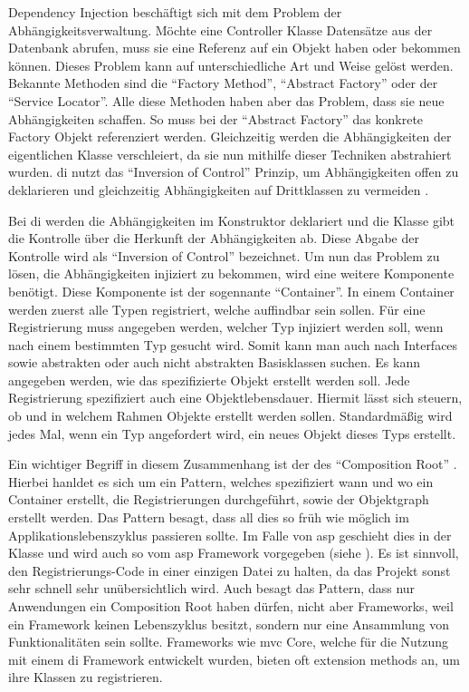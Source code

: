 

Dependency Injection beschäftigt sich mit dem Problem der Abhängigkeitsverwaltung. Möchte \zB eine Controller Klasse Datensätze aus der Datenbank abrufen, muss sie eine Referenz auf ein  Objekt haben oder bekommen können. Dieses Problem kann auf unterschiedliche Art und Weise gelöst werden. Bekannte Methoden sind die \enquote{Factory Method}, \enquote{Abstract Factory} oder der \enquote{Service Locator}. Alle diese Methoden haben aber das Problem, dass sie neue Abhängigkeiten schaffen. So muss \zB bei der \enquote{Abstract Factory} das konkrete Factory Objekt referenziert werden. Gleichzeitig werden die Abhängigkeiten der eigentlichen Klasse verschleiert, da sie nun mithilfe dieser Techniken abstrahiert wurden. \gls{di} nutzt das \enquote{Inversion of Control} Prinzip, um Abhängigkeiten offen zu deklarieren und gleichzeitig Abhängigkeiten auf Drittklassen zu vermeiden \cite{inversionOfControl} \cite{di}.

Bei \gls{di} werden die Abhängigkeiten im Konstruktor deklariert und die Klasse gibt die Kontrolle über die Herkunft der Abhängigkeiten ab. Diese Abgabe der Kontrolle wird als \enquote{Inversion of Control} bezeichnet. Um nun das Problem zu lösen, \dahe die Abhängigkeiten injiziert zu bekommen, wird eine weitere Komponente benötigt. Diese Komponente ist der sogennante \enquote{Container}. In einem Container werden zuerst alle Typen registriert, welche auffindbar sein sollen. Für eine Registrierung muss angegeben werden, welcher Typ injiziert werden soll, wenn nach einem bestimmten Typ gesucht wird. Somit kann man auch nach Interfaces sowie abstrakten oder auch nicht abstrakten Basisklassen suchen. Es kann angegeben werden, wie das spezifizierte Objekt erstellt werden soll. Jede Registrierung spezifiziert auch eine Objektlebensdauer. Hiermit lässt sich steuern, ob und in welchem Rahmen Objekte erstellt werden sollen. Standardmäßig wird jedes Mal, wenn ein Typ angefordert wird, ein neues Objekt dieses Typs erstellt.

Ein wichtiger Begriff in diesem Zusammenhang ist der des \enquote{Composition Root} \cite{compRoot}. Hierbei hanldet es sich um ein Pattern, welches spezifiziert wann und wo ein Container erstellt, die Registrierungen durchgeführt, sowie der Objektgraph erstellt werden. Das Pattern besagt, dass all dies so früh wie möglich im Applikationslebenszyklus passieren sollte. Im Falle von \gls{asp} geschieht dies in der  Klasse und wird auch so vom \gls{asp} Framework vorgegeben (siehe ). Es ist sinnvoll, den Registrierungs-Code in einer einzigen Datei zu halten, da das Projekt sonst sehr schnell sehr unübersichtlich wird. Auch besagt das Pattern, dass nur Anwendungen ein Composition Root haben dürfen, nicht aber Frameworks, weil ein Framework keinen Lebenszyklus besitzt, sondern nur eine Ansammlung von Funktionalitäten sein sollte. Frameworks wie \gls{mvc} Core, welche für die Nutzung mit einem \gls{di} Framework entwickelt wurden, bieten oft extension methods an, um ihre Klassen zu registrieren.
